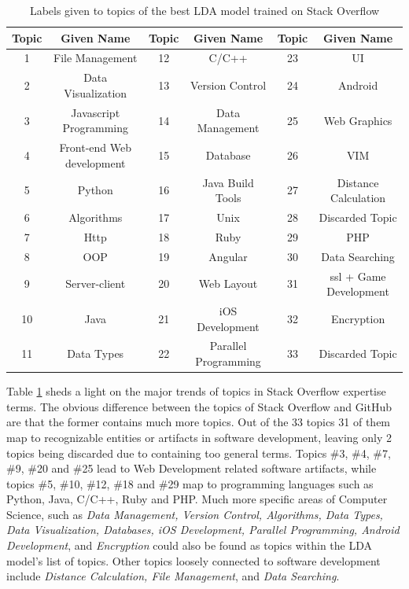             \begin{table}
              \centering
              \caption{Labels given to topics of the best LDA model trained on Stack Overflow}\label{tab:SO_LDA_labels}
                \vspace{6pt} %
               \resizebox{\textwidth}{!} {
              \begin{tabular}{|c c|c c|c c|}
                \hline
                Topic & Given Name & Topic & Given Name & Topic & Given Name \\
                \hline
                1 & File Management & 12 & C/C++ & 23 & UI \\
                2 & Data Visualization & 13 & Version Control & 24 & Android \\
                3 & Javascript Programming & 14 & Data Management & 25 & Web Graphics \\
                4 & Front-end Web development & 15 & Database & 26 & VIM \\
                5 & Python & 16 & Java Build Tools & 27 & Distance Calculation \\
                6 & Algorithms & 17 & Unix & 28 & Discarded Topic \\
                7 & Http & 18 & Ruby & 29 & PHP \\
                8 & OOP & 19 & Angular & 30 & Data Searching \\
                9 & Server-client & 20 & Web Layout & 31 & ssl + Game Development \\
                10 & Java & 21 & iOS Development & 32 & Encryption \\
                11 & Data Types & 22 & Parallel Programming & 33 & Discarded Topic \\
                \hline
              \end{tabular}}
            \end{table}
            
            Table \ref{tab:SO_LDA_labels} sheds a light on the major trends of topics in Stack Overflow expertise terms. The obvious difference between the topics of Stack Overflow and GitHub are that the former contains much more topics. Out of the 33 topics 31 of them map to recognizable entities or artifacts in software development, leaving only 2 topics being discarded due to containing too general terms. Topics \#3, \#4, \#7, \#9, \#20 and \#25 lead to Web Development related software artifacts, while topics \#5, \#10, \#12, \#18 and \#29 map to programming languages such as Python, Java, C/C++, Ruby and PHP. Much more specific areas of Computer Science, such as \emph{Data Management, Version Control, Algorithms, Data Types, Data Visualization, Databases, iOS Development, Parallel Programming, Android Development}, and \emph{Encryption} could also be found as topics within the LDA model's list of topics. Other topics loosely connected to software development include \emph{Distance Calculation, File Management}, and \emph{Data Searching}.
            
